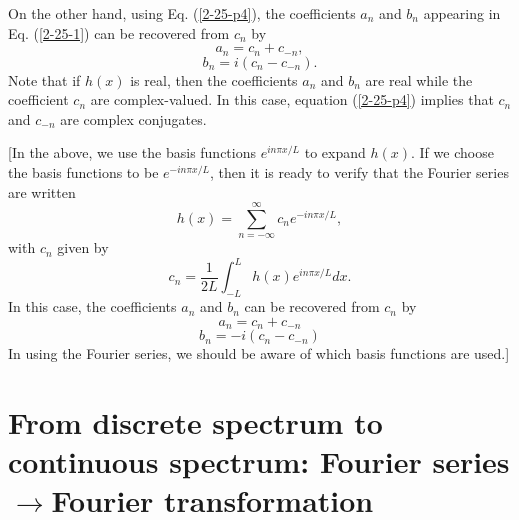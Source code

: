 \documentclass{article}
\begin{document}
On the other hand, using Eq. (\ref{2-25-p4}), the coefficients $a_n$ and $b_n$
appearing in Eq. (\ref{2-25-1}) can be recovered from $c_n$ by
\begin{equation}
  \label{11-8-e1} a_n = c_n + c_{- n},
\end{equation}
\begin{equation}
  \label{4-18-e1} b_n = i (c_n - c_{- n}) .
\end{equation}
Note that if $h (x)$ is real, then the coefficients $a_n$ and $b_n$ are real
while the coefficient $c_n$ are complex-valued. In this case, equation
(\ref{2-25-p4}) implies that $c_n$ and $c_{- n}$ are complex conjugates.

[In the above, we use the basis functions $e^{i n \pi x / L}$ to expand $h
(x)$. If we choose the basis functions to be $e^{- i n \pi x / L}$, then it is
ready to verify that the Fourier series are written
\begin{equation}
  h (x) = \sum_{n = - \infty}^{\infty} c_n e^{- i n \pi x / L},
\end{equation}
with $c_n$ given by
\begin{equation}
  c_n = \frac{1}{2 L} \int_{- L}^L h (x) e^{i n \pi x / L} d x.
\end{equation}
In this case, the coefficients $a_n$ and $b_n$ can be recovered from $c_n$ by
\begin{equation}
  \label{18-2-2p1} a_n = c_n + c_{- n}
\end{equation}
\begin{equation}
  \label{18-2-2p2} b_n = - i (c_n - c_{- n})
\end{equation}
In using the Fourier series, we should be aware of which basis functions are
used.]

\section{From discrete spectrum to continuous spectrum: Fourier
series$\rightarrow$Fourier transformation}
\end{document}

